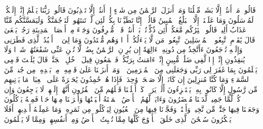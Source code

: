 \stopbuffer%
\startbuffer[\q:36:15]
قَالُوا۟ مَاۤ أَنتُمۡ إِلَّا بَشَرࣱ مِّثۡلُنَا وَمَاۤ أَنزَلَ ٱلرَّحۡمَٰنُ مِن شَیۡءٍ إِنۡ أَنتُمۡ إِلَّا تَكۡذِبُونَ%
\stopbuffer%
\startbuffer[\q:36:16]
قَالُوا۟ رَبُّنَا یَعۡلَمُ إِنَّاۤ إِلَیۡكُمۡ لَمُرۡسَلُونَ%
\stopbuffer%
\startbuffer[\q:36:17]
وَمَا عَلَیۡنَاۤ إِلَّا ٱلۡبَلَٰغُ ٱلۡمُبِینُ%
\stopbuffer%
\startbuffer[\q:36:18]
قَالُوۤا۟ إِنَّا تَطَیَّرۡنَا بِكُمۡۖ لَئِن لَّمۡ تَنتَهُوا۟ لَنَرۡجُمَنَّكُمۡ وَلَیَمَسَّنَّكُم مِّنَّا عَذَابٌ أَلِیمࣱ%
\stopbuffer%
\startbuffer[\q:36:19]
قَالُوا۟ طَٰۤئِرُكُم مَّعَكُمۡ أَئِن ذُكِّرۡتُمۚ بَلۡ أَنتُمۡ قَوۡمࣱ مُّسۡرِفُونَ%
\stopbuffer%
\startbuffer[\q:36:20]
وَجَاۤءَ مِنۡ أَقۡصَا ٱلۡمَدِینَةِ رَجُلࣱ یَسۡعَىٰ قَالَ یَٰقَوۡمِ ٱتَّبِعُوا۟ ٱلۡمُرۡسَلِینَ%
\stopbuffer%
\startbuffer[\q:36:21]
ٱتَّبِعُوا۟ مَن لَّا یَسۡءَلُكُمۡ أَجۡرࣰا وَهُم مُّهۡتَدُونَ%
\stopbuffer%
\startbuffer[\q:36:22]
وَمَا لِیَ لَاۤ أَعۡبُدُ ٱلَّذِی فَطَرَنِی وَإِلَیۡهِ تُرۡجَعُونَ%
\stopbuffer%
\startbuffer[\q:36:23]
ءَأَتَّخِذُ مِن دُونِهِۦۤ ءَالِهَةً إِن یُرِدۡنِ ٱلرَّحۡمَٰنُ بِضُرࣲّ لَّا تُغۡنِ عَنِّی شَفَٰعَتُهُمۡ شَیۡءࣰا وَلَا یُنقِذُونِ%
\stopbuffer%
\startbuffer[\q:36:24]
إِنِّیۤ إِذࣰا لَّفِی ضَلَٰلࣲ مُّبِینٍ%
\stopbuffer%
\startbuffer[\q:36:25]
إِنِّیۤ ءَامَنتُ بِرَبِّكُمۡ فَٱسۡمَعُونِ%
\stopbuffer%
\startbuffer[\q:36:26]
قِیلَ ٱدۡخُلِ ٱلۡجَنَّةَۖ قَالَ یَٰلَیۡتَ قَوۡمِی یَعۡلَمُونَ%
\stopbuffer%
\startbuffer[\q:36:27]
بِمَا غَفَرَ لِی رَبِّی وَجَعَلَنِی مِنَ ٱلۡمُكۡرَمِینَ%
\stopbuffer%
\startbuffer[\q:36:28]
۞ وَمَاۤ أَنزَلۡنَا عَلَىٰ قَوۡمِهِۦ مِنۢ بَعۡدِهِۦ مِن جُندࣲ مِّنَ ٱلسَّمَاۤءِ وَمَا كُنَّا مُنزِلِینَ%
\stopbuffer%
\startbuffer[\q:36:29]
إِن كَانَتۡ إِلَّا صَیۡحَةࣰ وَٰحِدَةࣰ فَإِذَا هُمۡ خَٰمِدُونَ%
\stopbuffer%
\startbuffer[\q:36:30]
یَٰحَسۡرَةً عَلَى ٱلۡعِبَادِۚ مَا یَأۡتِیهِم مِّن رَّسُولٍ إِلَّا كَانُوا۟ بِهِۦ یَسۡتَهۡزِءُونَ%
\stopbuffer%
\startbuffer[\q:36:31]
أَلَمۡ یَرَوۡا۟ كَمۡ أَهۡلَكۡنَا قَبۡلَهُم مِّنَ ٱلۡقُرُونِ أَنَّهُمۡ إِلَیۡهِمۡ لَا یَرۡجِعُونَ%
\stopbuffer%
\startbuffer[\q:36:32]
وَإِن كُلࣱّ لَّمَّا جَمِیعࣱ لَّدَیۡنَا مُحۡضَرُونَ%
\stopbuffer%
\startbuffer[\q:36:33]
وَءَایَةࣱ لَّهُمُ ٱلۡأَرۡضُ ٱلۡمَیۡتَةُ أَحۡیَیۡنَٰهَا وَأَخۡرَجۡنَا مِنۡهَا حَبࣰّا فَمِنۡهُ یَأۡكُلُونَ%
\stopbuffer%
\startbuffer[\q:36:34]
وَجَعَلۡنَا فِیهَا جَنَّٰتࣲ مِّن نَّخِیلࣲ وَأَعۡنَٰبࣲ وَفَجَّرۡنَا فِیهَا مِنَ ٱلۡعُیُونِ%
\stopbuffer%
\startbuffer[\q:36:35]
لِیَأۡكُلُوا۟ مِن ثَمَرِهِۦ وَمَا عَمِلَتۡهُ أَیۡدِیهِمۡۚ أَفَلَا یَشۡكُرُونَ%
\stopbuffer%
\startbuffer[\q:36:36]
سُبۡحَٰنَ ٱلَّذِی خَلَقَ ٱلۡأَزۡوَٰجَ كُلَّهَا مِمَّا تُنۢبِتُ ٱلۡأَرۡضُ وَمِنۡ أَنفُسِهِمۡ وَمِمَّا لَا یَعۡلَمُونَ%
\stopbuffer%
